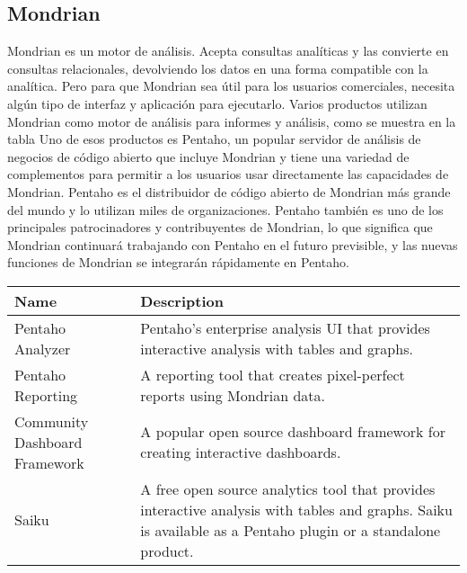 \begin{spacing}{1.5}
	\subsection{Mondrian}
			Mondrian es un motor de análisis. Acepta consultas analíticas y las convierte en consultas relacionales, devolviendo los datos en una forma compatible con la analítica. Pero para que Mondrian sea útil para los usuarios comerciales, necesita algún tipo de interfaz y aplicación para ejecutarlo.
			Varios productos utilizan Mondrian como motor de análisis para informes y análisis, como se muestra en la tabla  Uno de esos productos es Pentaho, un popular servidor de análisis de negocios de código abierto que incluye Mondrian y tiene una variedad de complementos para permitir a los usuarios usar directamente las capacidades de Mondrian. Pentaho es el distribuidor de código abierto de Mondrian más grande del mundo y lo utilizan miles de organizaciones. Pentaho también es uno de los principales patrocinadores y contribuyentes de Mondrian, lo que significa que Mondrian continuará trabajando con Pentaho en el futuro previsible, y las nuevas funciones de Mondrian se integrarán rápidamente en Pentaho.
			\begin{table}[]
				\begin{tabular}{|l|l|}
					\hline
					\rowcolor[HTML]{CBCEFB} 
					Name                          & Description                                                                                                                                                  \\ \hline
					Pentaho Analyzer              & Pentaho’s enterprise analysis UI that provides interactive analysis with tables and graphs.                                                                  \\ \hline
					Pentaho Reporting             & A reporting tool that creates pixel-perfect reports using Mondrian data.                                                                                     \\ \hline
					Community Dashboard Framework & A popular open source dashboard framework for creating interactive dashboards.                                                                               \\ \hline
					Saiku                         & A free open source analytics tool that provides interactive analysis with tables and graphs. Saiku is available as a Pentaho plugin or a standalone product. \\ \hline
				\end{tabular}
			\end{table}

\end{spacing}
